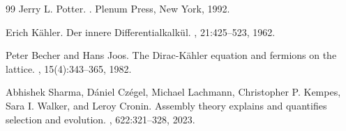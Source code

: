 \begin{thebibliography}{99}
Jerry L. Potter.
.
\newblock Plenum Press, New York, 1992.

Erich K{\"a}hler.
\newblock Der innere Differentialkalk{\"u}l.
, 21:425--523, 1962.

Peter Becher and Hans Joos.
\newblock The {D}irac-{K}{\"a}hler equation and fermions on the lattice.
, 15(4):343--365, 1982.

Abhishek Sharma, D{\'a}niel Cz{\'e}gel, Michael Lachmann, Christopher P. Kempes, Sara I. Walker, and Leroy Cronin.
\newblock Assembly theory explains and quantifies selection and evolution.
, 622:321--328, 2023.

\end{thebibliography}
\endgroup
